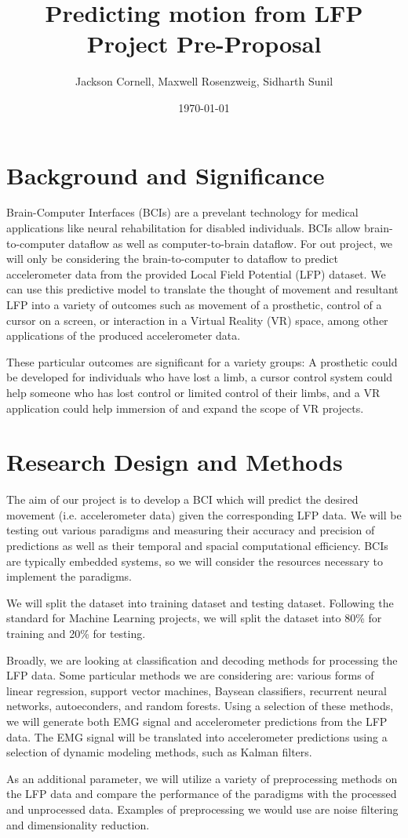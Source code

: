 \documentclass[12pt]{article}
\title{ Predicting motion from LFP Project Pre-Proposal }
\author{ Jackson Cornell, Maxwell Rosenzweig, Sidharth Sunil }
\date{\today}
\begin{document}
\maketitle

\section{Background and Significance}

Brain-Computer Interfaces (BCIs) are a prevelant technology for medical applications like neural rehabilitation for disabled individuals. BCIs allow brain-to-computer dataflow as well as computer-to-brain dataflow. For out project, we will only be considering the brain-to-computer to dataflow to predict accelerometer data from the provided Local Field Potential (LFP) dataset. We can use this predictive model to translate the thought of movement and resultant LFP into a variety of outcomes such as movement of a prosthetic, control of a cursor on a screen, or interaction in a Virtual Reality (VR) space, among other applications of the produced accelerometer data. 

These particular outcomes are significant for a variety groups: A prosthetic could be developed for individuals who have lost a limb, a cursor control system could help someone who has lost control or limited control of their limbs, and a VR application could help immersion of and expand the scope of VR projects. 

\section{Research Design and Methods}
The aim of our project is to develop a BCI which will predict the desired movement (i.e. accelerometer data) given the corresponding LFP data. We will be testing out various paradigms and measuring their accuracy and precision of predictions as well as their temporal and spacial computational efficiency. BCIs are typically embedded systems, so we will consider the resources necessary to implement the paradigms.

We will split the dataset into training dataset and testing dataset. Following the standard for Machine Learning projects, we will split the dataset into 80\% for training and 20\% for testing.

Broadly, we are looking at classification and decoding methods for processing the LFP data. Some particular methods we are considering are: various forms of linear regression, support vector machines, Baysean classifiers, recurrent neural networks, autoeconders, and random forests. Using a selection of these methods, we will generate both EMG signal and accelerometer predictions from the LFP data. The EMG signal will be translated into accelerometer predictions using a selection of dynamic modeling methods, such as Kalman filters.

As an additional parameter, we will utilize a variety of preprocessing methods on the LFP data and compare the performance of the paradigms with the processed and unprocessed data. Examples of preprocessing we would use are noise filtering and dimensionality reduction. 
\end{document}
